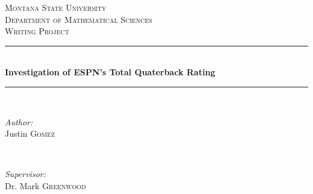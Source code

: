 \documentclass[12pt]{article}\usepackage[]{graphicx}\usepackage[]{color}
\begin{document}
\begin{titlepage}

\newcommand{\HRule}{\rule{\linewidth}{0.5mm}} %

\center %
 

\textsc{\LARGE Montana State University}\\[1.5cm] %
\textsc{\Large Department of Mathematical Sciences}\\[0.5cm] %
\textsc{\large Writing Project}\\[0.5cm] %


\HRule \\[0.4cm]
{ \huge \bfseries Investigation of ESPN's Total Quaterback Rating}\\[0.4cm] %
\HRule \\[1.5cm]
 

\begin{minipage}{0.4\textwidth}
\begin{flushleft} \large
\emph{Author:}\\
Justin \textsc{Gomez} %
\end{flushleft}
\end{minipage}
~
\begin{minipage}{0.4\textwidth}
\begin{flushright} \large
\emph{Supervisor:} \\
Dr. Mark \textsc{Greenwood} %
\end{flushright}
\end{minipage}\\[2cm]



\end{titlepage}
\end{document}
